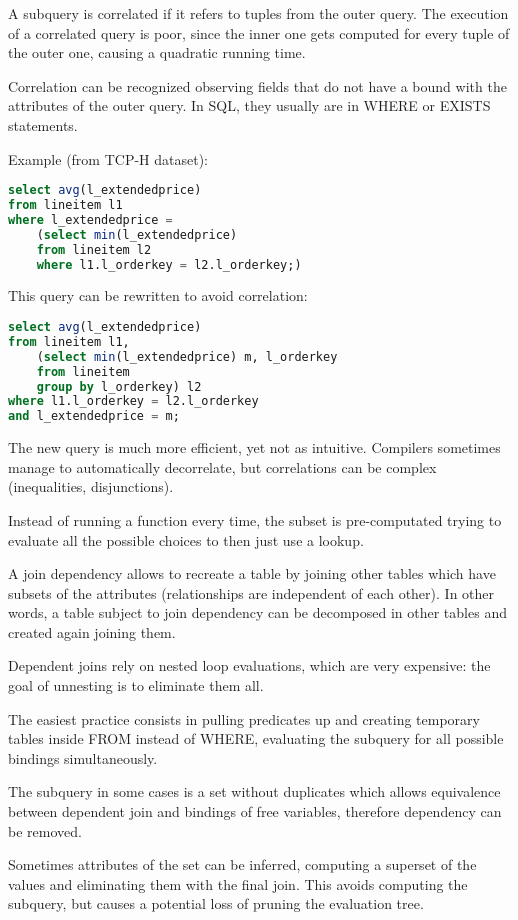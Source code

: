 A subquery is correlated if it refers to tuples from the outer query. The execution of a correlated query is poor, since the inner one gets computed for every tuple of the outer one, causing a quadratic running time.

Correlation can be recognized observing fields that do not have a bound with the attributes of the outer query. In SQL, they usually are in WHERE or EXISTS statements.

Example (from TCP-H dataset):
\begin{lstlisting}[language=SQL]
select avg(l_extendedprice)
from lineitem l1
where l_extendedprice =
	(select min(l_extendedprice)
	from lineitem l2
	where l1.l_orderkey = l2.l_orderkey;)
\end{lstlisting}

This query can be rewritten to avoid correlation:
\begin{lstlisting}[language=SQL]
select avg(l_extendedprice)
from lineitem l1,
	(select min(l_extendedprice) m, l_orderkey
	from lineitem
	group by l_orderkey) l2
where l1.l_orderkey = l2.l_orderkey
and l_extendedprice = m;
\end{lstlisting}

The new query is much more efficient, yet not as intuitive. Compilers sometimes manage to automatically decorrelate, but correlations can be complex (inequalities, disjunctions).

Instead of running a function every time, the subset is pre-computated trying to evaluate all the possible choices to then just use a lookup.

A join dependency allows to recreate a table by joining other tables which have subsets of the attributes (relationships are independent of each other). In other words, a table subject to join dependency can be decomposed in other tables and created again joining them.

Dependent joins rely on nested loop evaluations, which are very expensive: the goal of unnesting is to eliminate them all.

The easiest practice consists in pulling predicates up and creating temporary tables inside FROM instead of WHERE, evaluating the subquery for all possible bindings simultaneously. 

The subquery in some cases is a set without duplicates which allows equivalence between dependent join and bindings of free variables, therefore dependency can be removed.

Sometimes attributes of the set can be inferred, computing a superset of the values and eliminating them with the final join. This avoids computing the subquery, but causes a potential loss of pruning the evaluation tree.

